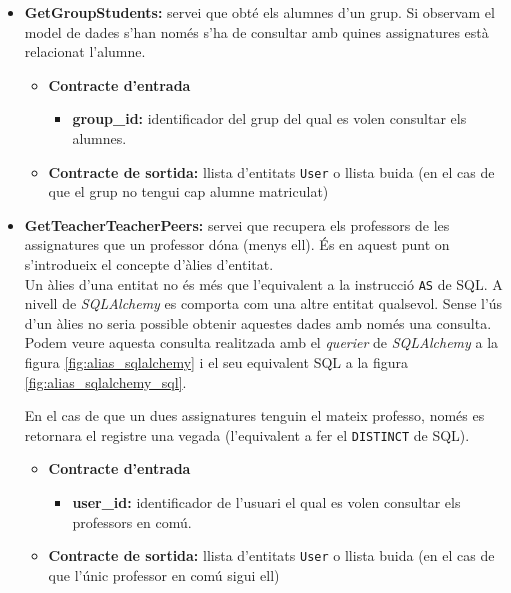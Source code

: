 \begin{itemize}
			\item \textbf{GetGroupStudents:} servei que obté els alumnes d'un grup. Si observam el model de dades s'han només s'ha de consultar amb quines assignatures està relacionat l'alumne.
				\begin{itemize}
					\item \textbf{Contracte d'entrada}
						\begin{itemize}
							\item \textbf{group\_id:} identificador del grup del qual es volen consultar els alumnes.
						\end{itemize}
					\item \textbf{Contracte de sortida:} llista d'entitats \texttt{User} o llista buida (en el cas de que el grup no tengui cap alumne matriculat)
				\end{itemize}
				
			\item \textbf{GetTeacherTeacherPeers:} servei que recupera els professors de les assignatures que un professor dóna (menys ell). És en aquest punt on s'introdueix el concepte d'àlies d'entitat. \\
			
			Un àlies d'una entitat no és més que l'equivalent a la instrucció \texttt{AS} de \ac{SQL}. A nivell de \emph{SQLAlchemy} es comporta com una altre entitat qualsevol. Sense l'ús d'un àlies no seria possible obtenir aquestes dades amb només una consulta. Podem veure aquesta consulta realitzada amb el \emph{querier} de \emph{SQLAlchemy} a la figura \ref{fig:alias_sqlalchemy} i el seu equivalent \ac{SQL} a la figura \ref{fig:alias_sqlalchemy_sql}.
			
			En el cas de que un dues assignatures tenguin el mateix professo, només es retornara el registre una vegada (l'equivalent a fer el \texttt{DISTINCT} de \ac{SQL}).
			
			\begin{itemize}
					\item \textbf{Contracte d'entrada}
						\begin{itemize}
							\item \textbf{user\_id:} identificador de l'usuari el qual es volen consultar els professors en comú.
						\end{itemize}
					\item \textbf{Contracte de sortida:} llista d'entitats \texttt{User} o llista buida (en el cas de que l'únic professor en comú sigui ell)
				\end{itemize}
			

\end{itemize}
